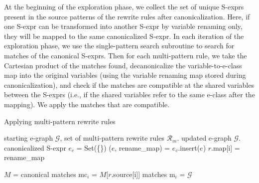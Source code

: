 At the beginning of the exploration phase, we collect the set of unique S-exprs present in the source patterns of the rewrite rules after canonicalization.
Here, if one S-expr can be transformed into another S-expr by variable renaming only, they will be mapped to the same canonicalized S-expr.
In each iteration of the exploration phase, we use the single-pattern search subroutine to search for matches of the canonical S-exprs.
Then for each multi-pattern rule, we take the Cartesian product of the matches found, decanonicalize the variable-to-e-class map into the original variables (using the variable renaming map stored during canonicalization), and check if the matches are compatible at the shared variables between the S-exprs (i.e., if the shared variables refer to the same e-class after the mapping).
We apply the matches that are compatible.

\begin{algorithm}[t]
\small
\caption{Applying multi-pattern rewrite rules}
\label{alg:multi}
\begin{algorithmic}[1]
\Require starting e-graph $\mathcal{G}$, set of multi-pattern rewrite rules $\mathcal{R}_m$.
\Ensure updated e-graph $\mathcal{G}$.
\State canonicalized S-expr $e_c$ = Set(\{\})
 
    \State ($e$, rename\_map) = 
    \State $e_c$.insert($e$)
    \State $r$.map[i] = rename\_map
\EndFor
\EndFor

    \State $M$ =  
        \State canonical matches mc$_i$ = $M$[$r$.source[i]]
        \State matches m$_i$ = 
        \EndFor
            \State {}
            \EndIf
        \EndFor
    \EndFor
  \EndFor
\State \Return $\mathcal{G}$
\end{algorithmic}
\end{algorithm}

\iffalse
\CUT{
Multi-pattern rewrite rules have some important features that require special attention.
The first one is that they can grow the e-graph infinitely.
Let's consider again the example rewrite rule in \autoref{fig:rewrite}.
This rule can be matched with any two \texttt{matmul} nodes with a shared input (input$_1$).
By applying this rule once on some match, a new \texttt{matmul} node will be created and added to the e-graph (the one on the RHS of \autoref{fig:rewrite}), which also has input$_1$ as its input.
This new \texttt{matmul} node together with any of the original \texttt{matmul} node will become a new match for this rule.
This way, the example rule can be applied infinitely to grow the e-graph.
}
\fi

